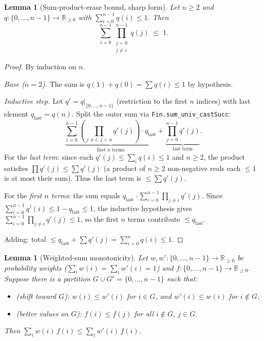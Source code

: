 \documentclass[reqno,11pt]{amsart}
\newcommand{\Rnn}{\mathbb{R}_{\ge 0}}
\theoremstyle{plain}
\newtheorem{lemma}[theorem]{Lemma}
\theoremstyle{definition}
\theoremstyle{remark}
\begin{document}
\begin{lemma}[Sum-product-erase bound, sharp form]\label{lem:sumprod-sharp}
Let $n \ge 2$ and $q : \{0,\ldots,n-1\} \to \Rnn$ with $\sum_{i=0}^{n-1} q(i) \le 1$. Then
\[
\sum_{i=0}^{n-1} \prod_{\substack{j=0\\j\ne i}}^{n-1} q(j) \;\le\; 1.
\]
\end{lemma}

\begin{proof}
By induction on $n$.

\emph{Base ($n = 2$).} The sum is $q(1) + q(0) = \sum q(i) \le 1$ by hypothesis.

\emph{Inductive step.} Let $q' = q|_{\{0,\ldots,n-1\}}$ (restriction to the first $n$ indices) with last element $q_{\mathrm{last}} = q(n)$. Split the outer sum via \texttt{Fin.sum\_univ\_castSucc}:
\[
\underbrace{\sum_{i=0}^{n-1} \left(\prod_{j\ne i,\, j<n} q'(j)\right) \cdot q_{\mathrm{last}}}_{\text{first }n\text{ terms}}
+ \underbrace{\prod_{j=0}^{n-1} q'(j)}_{\text{last term}}.
\]
For the \emph{last term}: since each $q'(j) \le \sum_i q(i) \le 1$ and $n \ge 2$, the product satisfies $\prod q'(j) \le \sum q'(j)$ (a product of $n \ge 2$ non-negative reals each $\le 1$ is at most their sum). Thus the last term is $\le \sum q'(j)$.

For the \emph{first $n$ terms}: the sum equals $q_{\mathrm{last}} \cdot \sum_{i=0}^{n-1}\prod_{j\ne i} q'(j)$. Since $\sum_{i=0}^{n-1} q'(i) \le 1 - q_{\mathrm{last}} \le 1$, the inductive hypothesis gives $\sum_{i=0}^{n-1}\prod_{j\ne i} q'(j) \le 1$, so the first $n$ terms contribute $\le q_{\mathrm{last}}$.

Adding: total $\le q_{\mathrm{last}} + \sum q'(j) = \sum_{i=0}^{n} q(i) \le 1$.
\end{proof}

\begin{lemma}[Weighted-sum monotonicity]\label{lem:weighted}
Let $w, w' : \{0,\ldots,n-1\} \to \Rnn$ be probability weights ($\sum_i w(i) = \sum_i w'(i) = 1$) and $f : \{0,\ldots,n-1\} \to \Rnn$. Suppose there is a partition $G \cup G^c = \{0,\ldots,n-1\}$ such that:
\begin{itemize}[leftmargin=*]
\item (shift toward $G$): $w(i) \le w'(i)$ for $i \in G$, and $w'(i) \le w(i)$ for $i \notin G$;
\item (better values on $G$): $f(i) \le f(j)$ for all $i \notin G$, $j \in G$.
\end{itemize}
Then $\sum_i w(i)\,f(i) \le \sum_i w'(i)\,f(i)$.
\end{lemma}
\end{document}
